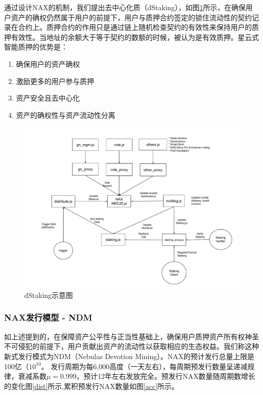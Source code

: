 通过设计NAX的机制，我们提出去中心化质（dStaking），如图\ref{fig:dStaking}所示，在确保用户资产的确权仍然属于用户的前提下，用户与质押合约签定的锁住流动性的契约记录在合约上。质押合约的作用只是通过链上随机检查契约的有效性来保持用户的质押有效性。当地址的余额大于等于契约的数额的时候，被认为是有效质押。星云式智能质押的优势是：
\begin{enumerate}[\hspace{2cm}(a)]
    \item 确保用户的资产确权
    \item 激励更多的用户参与质押
    \item 资产安全且去中心化
    \item 资产的确权性与资产流动性分离
\end{enumerate}

\begin{figure}[htbp]
  \centering
    \includegraphics[width=1\textwidth]{../common/nax.pdf}
    \caption{dStaking示意图 \label{fig:dStaking}}
\end{figure}

\subsubsection{NAX发行模型 - NDM}
如上述提到的，在保障资产公平性与正当性基础上，确保用户质押资产所有权神圣不可侵犯的前提下，用户贡献出资产的流动性以获取相应的生态权益。我们称这种新式发行模式为NDM（Nebulas Devotion Mining）。NAX的预计发行总量上限是100亿（\(10^{10}\)。 发行周期为每6,000高度（一天左右），每周期预发行数量呈递减规律，衰减系数$\mu=0.999$，预计12年左右发放完全。预发行NAX数量随周期数增长的变化图\ref{dist}所示,累积预发行NAX数量如图\ref{acc}所示。


